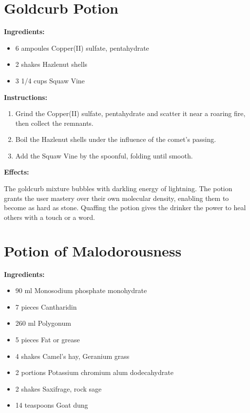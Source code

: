 \documentclass{article}
\begin{document}
\newpage
\section*{Goldcurb Potion}

\textbf{Ingredients:}

\begin{itemize}
  \item 6 ampoules Copper(II) sulfate, pentahydrate
  \item 2 shakes Hazlenut shells
  \item 3 1/4 cups Squaw Vine
\end{itemize}

\textbf{Instructions:}

\begin{enumerate}
  \item Grind the Copper(II) sulfate, pentahydrate and scatter it near a roaring fire, then collect the remnants.
  \item Boil the Hazlenut shells under the influence of the comet’s passing.
  \item Add the Squaw Vine by the spoonful, folding until smooth.
\end{enumerate}

\textbf{Effects:}

The goldcurb mixture bubbles with darkling energy of lightning. The potion grants the user mastery over their own molecular density, enabling them to become as hard as stone. Quaffing the potion gives the drinker the power to heal others with a touch or a word.

\newpage
\section*{Potion of Malodorousness}

\textbf{Ingredients:}

\begin{itemize}
  \item 90 ml Monosodium phosphate monohydrate
  \item 7 pieces Cantharidin
  \item 260 ml Polygonum
  \item 5 pieces Fat or grease
  \item 4 shakes Camel's hay, Geranium grass
  \item 2 portions Potassium chromium alum dodecahydrate
  \item 2 shakes Saxifrage, rock sage
  \item 14 teaspoons Goat dung
\end{itemize}
\end{document}
